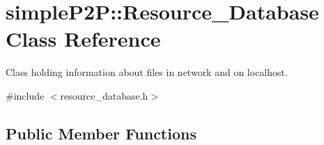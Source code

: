 \hypertarget{classsimpleP2P_1_1Resource__Database}{}\section{simple\+P2P\+:\+:Resource\+\_\+\+Database Class Reference}
\label{classsimpleP2P_1_1Resource__Database}


Class holding information about files in network and on localhost.  




{\ttfamily \#include $<$resource\+\_\+database.\+h$>$}

\subsection*{Public Member Functions}
